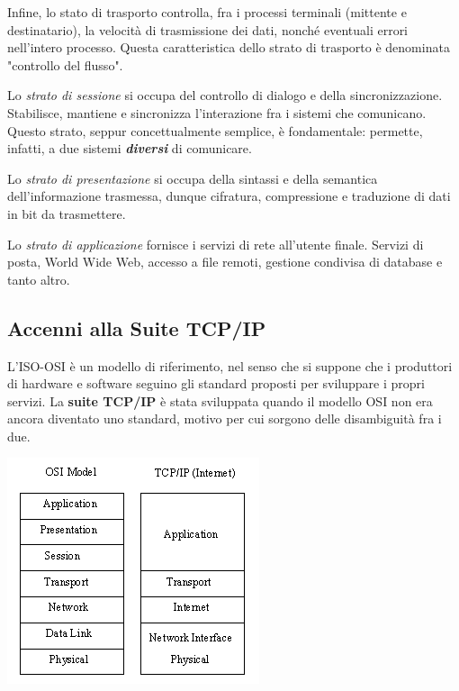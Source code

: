             Infine, lo stato di trasporto controlla, fra i processi terminali (mittente e destinatario), la velocità di trasmissione dei dati, nonché eventuali errori nell'intero processo. Questa caratteristica dello strato di trasporto è denominata "controllo del flusso".
        
        
            Lo \textit{strato di sessione} si occupa del controllo di dialogo e della sincronizzazione. Stabilisce, mantiene e sincronizza l'interazione fra i sistemi che comunicano. Questo strato, seppur concettualmente semplice, è fondamentale: permette, infatti, a due sistemi \textit{\textbf{diversi}} di comunicare.
        
        
            Lo \textit{strato di presentazione} si occupa della sintassi e della semantica dell'informazione trasmessa, dunque cifratura, compressione e traduzione di dati in bit da trasmettere.
        
        
            Lo \textit{strato di applicazione} fornisce i servizi di rete all'utente finale. Servizi di posta, World Wide Web, accesso a file remoti, gestione condivisa di database e tanto altro.
            
    \subsection{Accenni alla Suite TCP/IP}
        L'ISO-OSI è un modello di riferimento, nel senso che si suppone che i produttori di hardware e software seguino gli standard proposti per sviluppare i propri servizi. La \textbf{suite TCP/IP} è stata sviluppata quando il modello OSI non era ancora diventato uno standard, motivo per cui sorgono delle disambiguità fra i due. 
    
        \begin{center}
            \includegraphics{images/TCP.png}
        \end{center}
    
